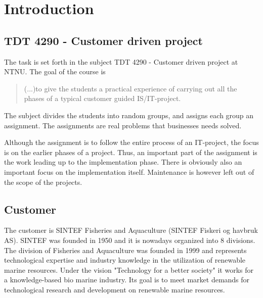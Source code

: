 \documentclass[11pt,a4paper,titlepage,oneside]{report}
\begin{document}
\tableofcontents
{}

\listoffigures
{}

\listoftables
{}

\setcounter{page}{0}


\chapter{Introduction}
\section{TDT 4290 - Customer driven project}
The task is set forth in the subject TDT 4290 - Customer driven project at \gls{NTNU}. The goal of the course is 
\begin{quote}
(...)to give the students a practical experience of carrying out all the phases of a typical customer guided IS/IT-project. \cite{TDT4290:Intro}
\end{quote}
The subject divides the students into random groups, and assigns each group an assignment. The assignments are real problems that businesses needs solved. 

Although the assignment is to follow the entire process of an IT-project, the focus is on the earlier phases of a project. Thus, an important part of the assignment is the work leading up to the implementation phase. There is obviously also an important focus on the implementation itself. Maintenance is however left out of the scope of the projects.

\section{Customer}
The customer is SINTEF Fisheries and Aquaculture (SINTEF Fiskeri og havbruk AS). 
SINTEF was founded in 1950 and it is nowadays organized into 8 divisions. The division of Fisheries and Aquaculture was founded in 1999 and represents technological expertise and industry knowledge in the utilization of renewable marine resources. Under the vision "Technology for a better society" it works for a knowledge-based bio marine industry. Its goal is to meet market demands for technological research and development on renewable marine resources.
\end{document}
